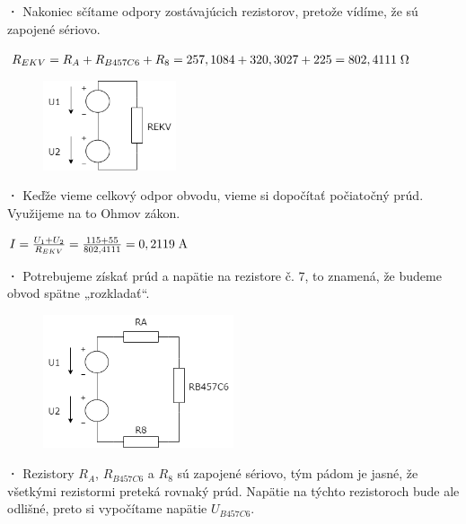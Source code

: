 \textbf{·}
Nakoniec sčítame odpory zostávajúcich rezistorov, pretože vídíme, že sú zapojené sériovo.\\

\begin{center}
$R_{EKV} = R_{A} + R_{B457C6} + R_{8}  = 257,1084 + 320,3027 + 225 = 802,4111 \hspace{0,1cm} \SI{}{\ohm}$
\end{center}

\begin{figure}[h!]
    \centering
    \includegraphics[width=0.35\textwidth]{IEL-Project/pictures/Pr1_7.png}
\end{figure}

\newpage

\textbf{·}
Keďže vieme celkový odpor obvodu, vieme si dopočítať počiatočný prúd. Využijeme na to Ohmov zákon.\\

\begin{center}   
$I = \frac{U_1 + U_2}{R_{EKV}} = \frac{115 + 55}{802,4111} = 0,2119 \hspace{0,1cm} \SI{}{\ampere}$ \\
\end{center}

\textbf{·}
Potrebujeme získať prúd a napätie na rezistore č. 7, to znamená, že budeme obvod spätne „rozkladať“.\\

\begin{figure}[h!]
    \centering
    \includegraphics[width=0.5\textwidth]{IEL-Project/pictures/Pr1_6.png}
\end{figure}

\textbf{·}
Rezistory $R_A$, $R_{B457C6}$ a $R_8$ sú zapojené sériovo, tým pádom je jasné, že všetkými rezistormi preteká rovnaký prúd. Napätie na týchto rezistoroch bude ale odlišné, preto si vypočítame napätie $U_{B457C6}$.

